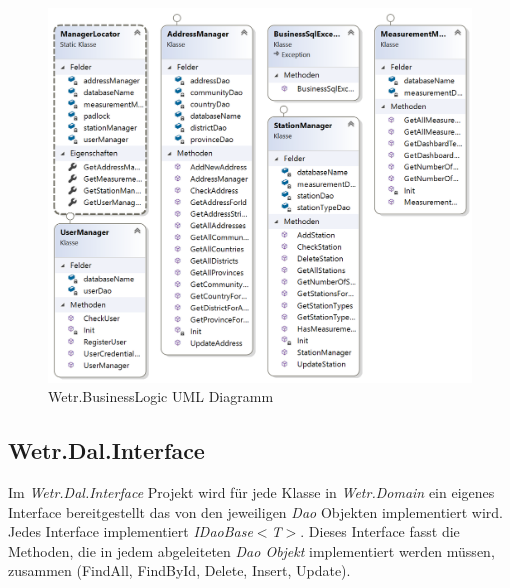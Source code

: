 \begin{figure}[H]
\centering
\includegraphics[width=\textwidth]{pictures/BusinessLogic.png}
\caption{Wetr.BusinessLogic UML Diagramm}
\label{fig:Wetr.BusinessLogic}
\end{figure}
\raggedright

\newpage
\subsection{Wetr.Dal.Interface}
Im \textit{Wetr.Dal.Interface} Projekt wird für jede Klasse in  \textit{Wetr.Domain} ein eigenes Interface bereitgestellt das von den jeweiligen \textit{Dao} Objekten implementiert wird. Jedes Interface implementiert \textit{IDaoBase}$<$\textit{T}$>$. Dieses Interface fasst die Methoden, die in jedem abgeleiteten \textit{Dao Objekt} implementiert werden müssen, zusammen (FindAll, FindById, Delete, Insert, Update).

